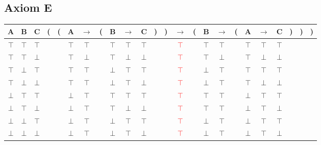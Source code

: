 \documentclass{article}
\begin{document}
\subsection{Axiom E}
\begin{tabular}{@{ }c@{ }@{ }c@{ }@{ }c | c@{}@{}c@{}@{ }c@{ }@{ }c@{ }@{}c@{}@{ }c@{ }@{ }c@{ }@{ }c@{ }@{}c@{}@{}c@{}@{ }c@{ }@{}c@{}@{ }c@{ }@{ }c@{ }@{}c@{}@{ }c@{ }@{ }c@{ }@{ }c@{ }@{}c@{}@{}c@{}@{}c@{ }}
A & B & C & ( & ( & A & $\rightarrow$ & ( & B & $\rightarrow$ & C & ) & ) & $\rightarrow$ & ( & B & $\rightarrow$ & ( & A & $\rightarrow$ & C & ) & ) & )\\
\hline 
$\top$ & $\top$ & $\top$ &  &  & $\top$ & $\top$ &  & $\top$ & $\top$ & $\top$ &  &  & \textcolor{red}{$\top$} &  & $\top$ & $\top$ &  & $\top$ & $\top$ & $\top$ &  &  & \\
$\top$ & $\top$ & $\bot$ &  &  & $\top$ & $\bot$ &  & $\top$ & $\bot$ & $\bot$ &  &  & \textcolor{red}{$\top$} &  & $\top$ & $\bot$ &  & $\top$ & $\bot$ & $\bot$ &  &  & \\
$\top$ & $\bot$ & $\top$ &  &  & $\top$ & $\top$ &  & $\bot$ & $\top$ & $\top$ &  &  & \textcolor{red}{$\top$} &  & $\bot$ & $\top$ &  & $\top$ & $\top$ & $\top$ &  &  & \\
$\top$ & $\bot$ & $\bot$ &  &  & $\top$ & $\top$ &  & $\bot$ & $\top$ & $\bot$ &  &  & \textcolor{red}{$\top$} &  & $\bot$ & $\top$ &  & $\top$ & $\bot$ & $\bot$ &  &  & \\
$\bot$ & $\top$ & $\top$ &  &  & $\bot$ & $\top$ &  & $\top$ & $\top$ & $\top$ &  &  & \textcolor{red}{$\top$} &  & $\top$ & $\top$ &  & $\bot$ & $\top$ & $\top$ &  &  & \\
$\bot$ & $\top$ & $\bot$ &  &  & $\bot$ & $\top$ &  & $\top$ & $\bot$ & $\bot$ &  &  & \textcolor{red}{$\top$} &  & $\top$ & $\top$ &  & $\bot$ & $\top$ & $\bot$ &  &  & \\
$\bot$ & $\bot$ & $\top$ &  &  & $\bot$ & $\top$ &  & $\bot$ & $\top$ & $\top$ &  &  & \textcolor{red}{$\top$} &  & $\bot$ & $\top$ &  & $\bot$ & $\top$ & $\top$ &  &  & \\
$\bot$ & $\bot$ & $\bot$ &  &  & $\bot$ & $\top$ &  & $\bot$ & $\top$ & $\bot$ &  &  & \textcolor{red}{$\top$} &  & $\bot$ & $\top$ &  & $\bot$ & $\top$ & $\bot$ &  &  & \\
\end{tabular}
\end{document}
